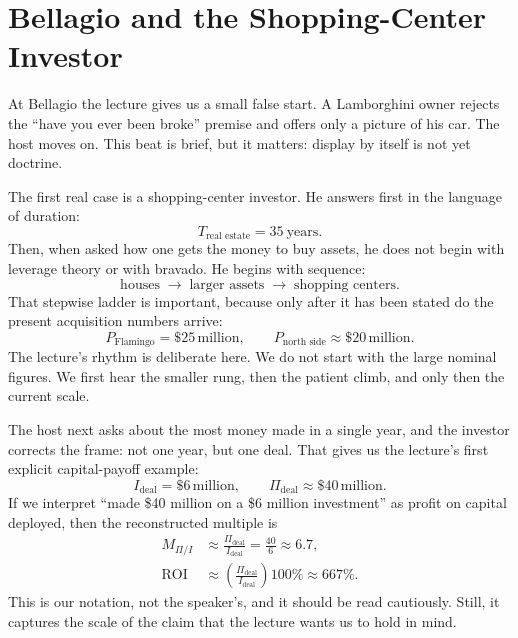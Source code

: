 \section{Bellagio and the Shopping-Center Investor}

At Bellagio the lecture gives us a small false start. A Lamborghini owner rejects the ``have you ever been broke'' premise and offers only a picture of his car. The host moves on. This beat is brief, but it matters: display by itself is not yet doctrine.

The first real case is a shopping-center investor. He answers first in the language of duration:
\begin{equation}
T_{\text{real estate}} = 35\ \text{years}.
\end{equation}
Then, when asked how one gets the money to buy assets, he does not begin with leverage theory or with bravado. He begins with sequence:
\begin{equation}
\text{houses} \;\to\; \text{larger assets} \;\to\; \text{shopping centers}.
\end{equation}
That stepwise ladder is important, because only after it has been stated do the present acquisition numbers arrive:
\begin{equation}
P_{\text{Flamingo}} = \$25\,\text{million},\qquad
P_{\text{north side}} \approx \$20\,\text{million}.
\end{equation}
The lecture's rhythm is deliberate here. We do not start with the large nominal figures. We first hear the smaller rung, then the patient climb, and only then the current scale.

The host next asks about the most money made in a single year, and the investor corrects the frame: not one year, but one deal. That gives us the lecture's first explicit capital-payoff example:
\begin{equation}
I_{\text{deal}} = \$6\,\text{million},\qquad
\Pi_{\text{deal}} \approx \$40\,\text{million}.
\end{equation}
If we interpret ``made \$40 million on a \$6 million investment'' as profit on capital deployed, then the reconstructed multiple is
\begin{align}
M_{\Pi/I}
&\approx \frac{\Pi_{\text{deal}}}{I_{\text{deal}}}
= \frac{40}{6}
\approx 6.7,\\
\text{ROI}
&\approx \left(\frac{\Pi_{\text{deal}}}{I_{\text{deal}}}\right)100\%
\approx 667\%.
\end{align}
This is our notation, not the speaker's, and it should be read cautiously. Still, it captures the scale of the claim that the lecture wants us to hold in mind.


